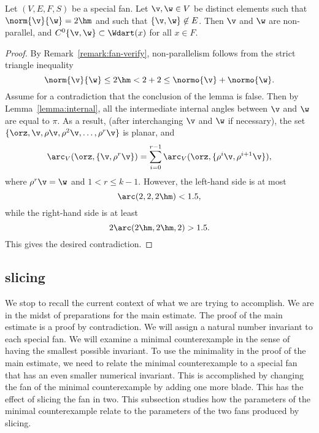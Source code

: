 \begin{lemma}[]\label{lemma:2hm-slice}
Let $(V,E,F,S)$ be a special fan.  Let $\v,\w\in V$ be distinct
elements such that $\norm{\v}{\w}=2\hm$ and such that
$\{\v,\w\}\not\in E$.  Then $\v$ and $\w$ are non-parallel, and
$C^0\{\v,\w\}\subset \Wdart(x)$ for all $x\in F$.
\end{lemma}

\begin{proof} By Remark~\ref{remark:fan-verify}, non-parallelism follows
from the strict triangle inequality
\begin{displaymath}
\norm{\v}{\w} \le 2\hm < 2 + 2 \le \normo{\v} + \normo{\w}.
\end{displaymath}
Assume for a contradiction that the conclusion of the lemma is false.
Then by Lemma~\ref{lemma:internal}, all the intermediate internal
angles between $\v$ and $\w$ are equal to $\pi$.  As a result, (after
interchanging $\v$ and $\w$ if necessary), the set
$\{\orz,\v,\rho\v,\rho^2\v,\ldots,\rho^r\v\}$ is planar, and
\begin{displaymath}
  \arc_V(\orz,\{\v,\rho^r\v\}) 
= \sum_{i=0}^{r-1} \arc_V(\orz,\{\rho^i\v,\rho^{i+1}\v\}),
\end{displaymath}
where $\rho^r \v = \w$ and $1 < r \le k-1$.
However, the left-hand side is at most
\begin{displaymath}
\arc(2,2,2\hm) < 1.5,
\end{displaymath}
while the right-hand side is at least
\begin{displaymath}
2\arc(2\hm,2\hm,2) > 1.5.
\end{displaymath}
This gives the desired contradiction.
\end{proof}

\subsection{slicing}

We stop to recall the current context of what we are trying to accomplish.
We are in the midst of preparations for the main estimate.
The proof of the main estimate is a proof by contradiction.  We will
assign a natural number invariant to each special fan.  We will
examine a minimal counterexample in the sense of having the smallest
possible invariant.  To use the minimality in the proof of the main
estimate, we need to relate the minimal counterexample to a special
fan that has an even smaller numerical invariant. This is accomplished
by changing the fan of the minimal counterexample by adding one more
blade.  This has the effect of slicing the fan in two.  This
subsection studies how the parameters of the minimal counterexample
relate to the parameters of the two fans produced by slicing.

